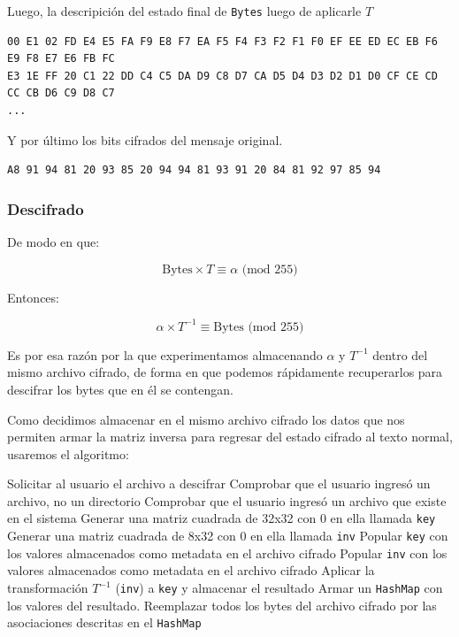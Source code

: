 \documentclass[a4paper]{article}
\begin{document}
Luego, la descripición del estado final de \texttt{Bytes} luego de aplicarle $T$

\begin{verbatim}
00 E1 02 FD E4 E5 FA F9 E8 F7 EA F5 F4 F3 F2 F1 F0 EF EE ED EC EB F6 E9 F8 E7 E6 FB FC
E3 1E FF 20 C1 22 DD C4 C5 DA D9 C8 D7 CA D5 D4 D3 D2 D1 D0 CF CE CD CC CB D6 C9 D8 C7
...
\end{verbatim}

Y por último los bits cifrados del mensaje original.

\begin{verbatim}
A8 91 94 81 20 93 85 20 94 94 81 93 91 20 84 81 92 97 85 94
\end{verbatim}

\subsubsection{Descifrado}

De modo en que:

\[
\text{Bytes} \times T \equiv \alpha \text{ (mod 255)}
\]

Entonces:


\[
\alpha \times T^{-1} \equiv \text{Bytes} \text{ (mod 255)}
\]

Es por esa razón por la que experimentamos almacenando $\alpha$ y $T^{-1}$ dentro del mismo archivo cifrado, de forma en que podemos rápidamente recuperarlos para descifrar los bytes que en él se contengan.

Como decidimos almacenar en el mismo archivo cifrado los datos que nos permiten armar la matriz inversa para regresar del estado cifrado al texto normal, usaremos el algoritmo:

\begin{outline}[enumerate]
    \1 Solicitar al usuario el archivo a descifrar
    \1 Comprobar que el usuario ingresó un archivo, no un directorio
    \1 Comprobar que el usuario ingresó un archivo que existe en el sistema
    \1 Generar una matriz cuadrada de 32x32 con 0 en ella llamada \texttt{key}
    \1 Generar una matriz cuadrada de 8x32 con 0 en ella llamada \texttt{inv}
    \1 Popular \texttt{key} con los valores almacenados como metadata en el archivo cifrado
    \1 Popular \texttt{inv} con los valores almacenados como metadata en el archivo cifrado
    \1 Aplicar la transformación $T^{-1}$ (\texttt{inv}) a \texttt{key} y almacenar el resultado
    \1 Armar un \texttt{HashMap} con los valores del resultado.
    \1 Reemplazar todos los bytes del archivo cifrado por las asociaciones descritas en el \texttt{HashMap}
\end{outline}
\end{document}
